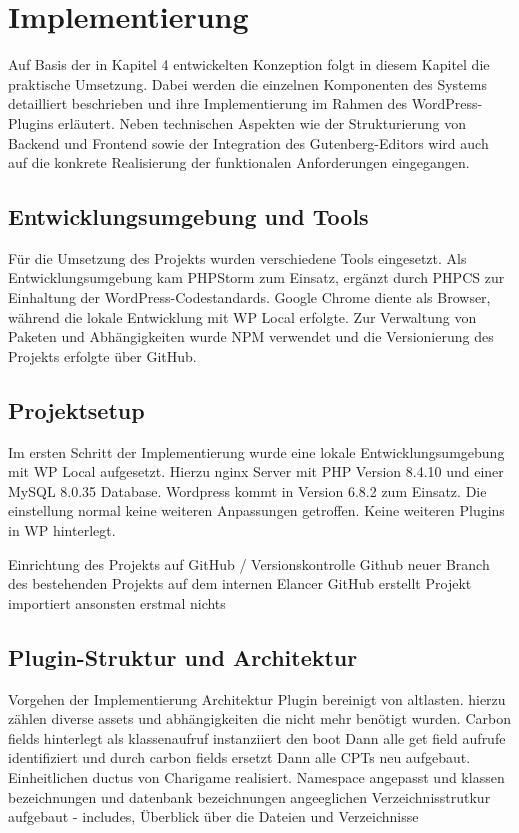 \chapter{Implementierung}
\label{chap:literature}
Auf Basis der in Kapitel 4 entwickelten Konzeption folgt in diesem Kapitel die praktische Umsetzung. Dabei werden die einzelnen Komponenten des Systems detailliert beschrieben und ihre Implementierung im Rahmen des WordPress-Plugins erläutert. Neben technischen Aspekten wie der Strukturierung von Backend und Frontend sowie der Integration des Gutenberg-Editors wird auch auf die konkrete Realisierung der funktionalen Anforderungen eingegangen.
\section{Entwicklungsumgebung und Tools}
Für die Umsetzung des Projekts wurden verschiedene Tools eingesetzt.
Als Entwicklungsumgebung kam PHPStorm zum Einsatz, ergänzt durch PHPCS zur Einhaltung der WordPress-Codestandards.
Google Chrome diente als Browser, während die lokale Entwicklung mit WP Local erfolgte.
Zur Verwaltung von Paketen und Abhängigkeiten wurde NPM verwendet und die Versionierung des Projekts erfolgte über GitHub.

\section{Projektsetup}
Im ersten Schritt der Implementierung wurde eine lokale Entwicklungsumgebung mit WP Local aufgesetzt.
Hierzu nginx Server mit PHP Version 8.4.10 und einer MySQL 8.0.35 Database.
Wordpress kommt in Version 6.8.2 zum Einsatz.
Die einstellung normal keine weiteren Anpassungen getroffen.
Keine weiteren Plugins in WP hinterlegt.

Einrichtung des Projekts auf GitHub / Versionskontrolle
Github neuer Branch des bestehenden Projekts auf dem internen Elancer GitHub erstellt
Projekt importiert ansonsten erstmal nichts

\section{Plugin-Struktur und Architektur}
Vorgehen der Implementierung
Architektur
Plugin bereinigt von altlasten. hierzu zählen diverse assets und abhängigkeiten die nicht mehr benötigt wurden.
Carbon fields hinterlegt als klassenaufruf instanziiert den boot
Dann alle get field aufrufe identifiziert und durch carbon fields ersetzt
Dann alle CPTs neu aufgebaut. Einheitlichen ductus von Charigame realisiert.
Namespace angepasst und klassen bezeichnungen und datenbank bezeichnungen angeeglichen
Verzeichnisstrutkur aufgebaut - includes,
Überblick über die Dateien und Verzeichnisse

